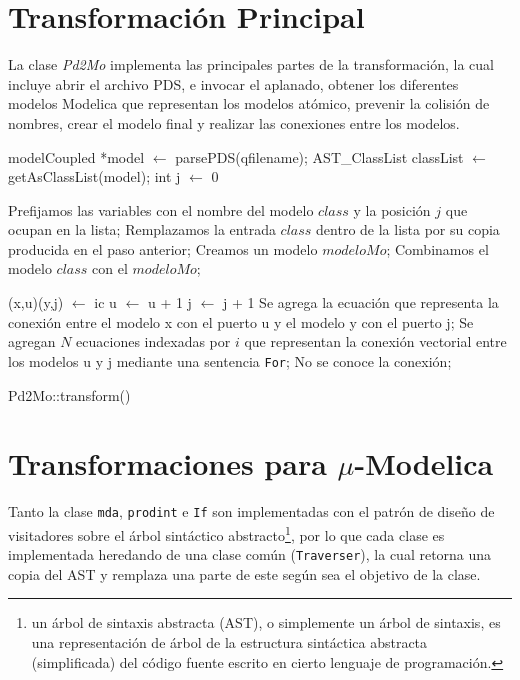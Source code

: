 \section{Transformación Principal}
La clase \emph{Pd2Mo} implementa las principales partes de la transformación, la cual incluye abrir el archivo PDS, e invocar el aplanado, obtener los diferentes modelos Modelica que representan los modelos atómico, prevenir la colisión de nombres, crear el modelo final y realizar las conexiones entre los modelos.

\begin{algorithm}[H]
\begin{algorithmic}[1]
\State modelCoupled *model $\gets$ parsePDS(qfilename);
\State AST\_ClassList classList $\gets$ getAsClassList(model); 
\State int j $\gets$ 0\;

 		\State Prefijamos las variables con el nombre del modelo $class$ y la posición $j$ que ocupan en la lista;
 		\State Remplazamos la entrada $class$ dentro de la lista por su copia producida en el paso anterior;
 	\EndIf
\EndFor
\State Creamos un modelo $modeloMo$;
 	\State Combinamos el modelo $class$ con el $modeloMo$;
\EndFor

	\State (x,u)(y,j) $\gets$ ic
	\State u $\gets$ u + 1
	\State j $\gets$ j + 1
  		\State Se agrega la ecuación que representa la conexión entre el modelo x con el puerto u y el modelo y con el puerto j;
  		\State Se agregan $N$ ecuaciones indexadas por $i$ que representan la conexión vectorial entre los modelos u y j mediante una sentencia \texttt{For};
  	\Else
  		\State No se conoce la conexión;
	\EndIf
\EndFor
\end{algorithmic}
 \caption{Pd2Mo::transform()}
\end{algorithm}

 
\section{Transformaciones para $\mu$-Modelica} \label{sec:transform}
	Tanto la clase \texttt{mda}, \texttt{prodint} e \texttt{If} son implementadas con el patrón de diseño de visitadores sobre 
	el árbol sintáctico abstracto\footnote{un árbol de sintaxis abstracta (AST), o simplemente un árbol de sintaxis, es una representación 
	de árbol de la estructura sintáctica abstracta (simplificada) del código fuente escrito en cierto lenguaje de programación.}, por lo que 
	cada clase es implementada heredando de una clase común (\texttt{Traverser}), la cual retorna una copia del AST y remplaza una parte de este según sea el 
	objetivo de la clase.
	
